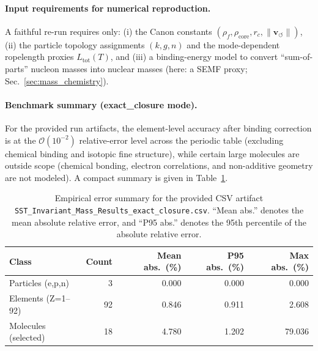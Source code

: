 \documentclass[10pt]{article}
\begin{document}
\paragraph{Input requirements for numerical reproduction.}
A faithful re-run requires only:
(i) the Canon constants \((\rho_{\!f}, \rho_{\text{core}}, r_c, \lVert \mathbf{v}_{\!\boldsymbol{\circlearrowleft}}\rVert)\),
(ii) the particle topology assignments \((k,g,n)\) and the mode-dependent ropelength proxies \(L_{\text{tot}}(T)\),
and (iii) a binding-energy model to convert ``sum-of-parts'' nucleon masses into nuclear masses (here: a SEMF proxy; Sec.~\ref{sec:mass_chemistry}).

\paragraph{Benchmark summary (exact\_closure mode).}
For the provided run artifacts, the element-level accuracy after binding correction is at the \(\mathcal{O}(10^{-2})\) relative-error level across the periodic table (excluding chemical binding and isotopic fine structure), while certain large molecules are outside scope (chemical bonding, electron correlations, and non-additive geometry are not modeled). A compact summary is given in Table~\ref{tab:benchmarks_summary}.

\begin{table}[t]
\centering
\caption{Empirical error summary for the provided CSV artifact \texttt{SST\_Invariant\_Mass\_Results\_exact\_closure.csv}. ``Mean abs.'' denotes the mean absolute relative error, and ``P95 abs.'' denotes the 95th percentile of the absolute relative error.}
\label{tab:benchmarks_summary}
\begin{tabular}{lrrrr}
\toprule
Class & Count & Mean abs.\ (\%) & P95 abs.\ (\%) & Max abs.\ (\%) \\
\midrule
Particles (e,p,n) & 3 & 0.000 & 0.000 & 0.000 \\
Elements (Z=1--92) & 92 & 0.846 & 0.911 & 2.608 \\
Molecules (selected) & 18 & 4.780 & 1.202 & 79.036 \\
\bottomrule
\end{tabular}
\end{table}
\end{document}
